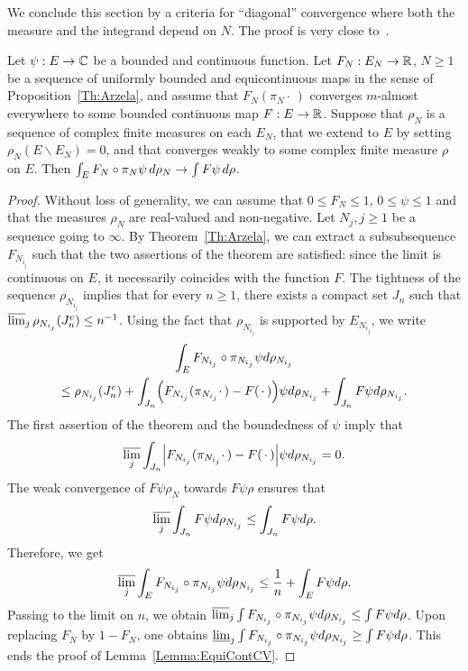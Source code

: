 \documentclass[AHL,Unicode,longabstracts]{cedram}
\theoremstyle{plain}
\newcommand{\bbC}{\mathbb{C}}
\newcommand{\R}{\mathbb{R}}
\let\originalleft\left
\let\originalright\right
\renewcommand{\left}{\mathopen{}\mathclose\bgroup\originalleft}
\renewcommand{\right}{\aftergroup\egroup\originalright}
\renewcommand*{\to}{\mathchoice{\longrightarrow}{\rightarrow}{\rightarrow}{\rightarrow}}
\begin{document}
We conclude this section by a criteria for ``diagonal'' convergence where both the measure and the integrand depend on $N$. The proof is very close to~\cite[Lemma~1]{Zambotti2001}.

\begin{lemm}\label{Lemma:EquiContCV}
Let $\psi:E\to \bbC$ be a bounded and continuous function. Let $F_N:E_N\to \R$, $N\geq 1$ be a sequence of uniformly bounded and equicontinuous maps in the sense of Proposition~\ref{Th:Arzela}, and assume that $F_N(\pi_N\cdot\,)$ converges $m$-almost everywhere to some bounded continuous map $F:E\to\R$. Suppose that $\rho_N$ is a sequence of complex finite measures on each $E_N$, that we extend to $E$ by setting $\rho_N(E\backslash E_N) = 0$, and that converges weakly to some complex finite measure $\rho$ on $E$. Then $\int_E F_N\circ \pi_N \psi \,d\rho_N \to \int F \psi \,d\rho$.
\end{lemm}
\begin{proof}
Without loss of generality, we can assume that $0\leq F_N \leq 1$, $0\leq \psi \leq 1$ and that the measures $\rho_N$ are real-valued and non-negative. Let ${N}_j,j\geq 1$ be a sequence going to $\infty$. By Theorem~\ref{Th:Arzela}, we can extract a subsubsequence $F_{N_{i_j}}$ such that the two assertions of the theorem are satisfied: since the limit is continuous on $E$, it necessarily coincides with the function $F$. The tightness of the sequence $\rho_{N_{i_j}}$ implies that for every $n\geq 1$, there exists a compact set $J_n$ such that $\varlimsup_j \rho_{N_{i_j}}(J_n^c) \leq n^{-1}$. Using the fact that $\rho_{N_{i_j}}$ is supported by $E_{N_{i_j}}$, we write
\begin{multline}
\int_E F_{N_{i_j}}\circ \pi_{N_{i_j}} \psi d\rho_{N_{i_j}} \\
\leq \rho_{N_{i_j}}\left(J_n^c\right) + \int_{J_n} \left(F_{N_{i_j}}(\pi_{N_{i_j}}\cdot\,)-F(\,\cdot\,)\right) \psi d\rho_{N_{i_j}} + \int_{J_n} F \psi d\rho_{N_{i_j}}.
\end{multline}
The first assertion of the theorem and the boundedness of $\psi$ imply that
\[
\varlimsup_{j}\int_{J_n} \left|F_{N_{i_j}}(\pi_{N_{i_j}}\cdot\,)-F(\,\cdot\,)\right| \psi d\rho_{N_{i_j}} = 0.
\]
The weak convergence of $F\psi\rho_N$ towards $F\psi\rho$ ensures that
\[
\varlimsup_{j} \int_{J_n} F \psi d\rho_{N_{i_j}} \leq \int_{J_n} F \psi d\rho.
\]
Therefore, we get
\begin{equation}
\varlimsup_{j} \int_E F_{N_{i_j}}\circ \pi_{N_{i_j}} \psi d\rho_{N_{i_j}} \leq \frac{1}{n} + \int_E F \psi d\rho.
\end{equation}
Passing to the limit on $n$, we obtain $\varlimsup_{j} \int F_{N_{i_j}}\circ \pi_{N_{i_j}} \psi d\rho_{N_{i_j}} \leq \int F \psi d\rho$. Upon replacing $F_N$ by $1-F_N$, one obtains $\varliminf_{j} \int F_{N_{i_j}}\circ \pi_{N_{i_j}} \psi d\rho_{N_{i_j}} \geq \int F \psi d\rho$. This ends the proof of Lemma~\ref{Lemma:EquiContCV}.
\end{proof}
\end{document}
